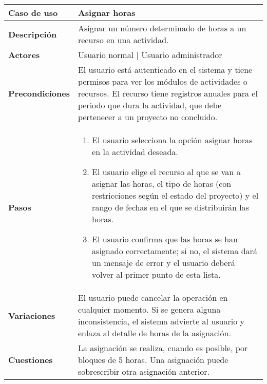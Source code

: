 \begin{tabular}{|p{1.25in}|p{3.65in}|}\hline
\textbf{Caso de uso} & \textbf{Asignar horas}\\\hline\hline
\textbf{Descripción} & Asignar un número determinado de horas a un recurso en
una actividad. \\\hline
\textbf{Actores} & Usuario normal | Usuario administrador\\\hline
\textbf{Precondiciones} & El usuario está autenticado en el sistema y
tiene permisos para ver los módulos de actividades o recursos. El
recurso tiene registros anuales para el periodo que dura la actividad,
que debe pertenecer a un proyecto no concluido.\\\hline
\textbf{Pasos} &
  \begin{enumerate}
   \item El usuario selecciona la opción asignar horas en la actividad deseada.
   \item El usuario elige el recurso al que se van a asignar las horas, el
tipo de horas (con restricciones según el estado del proyecto) y el rango de
fechas en el que se distribuirán las horas.
   \item El usuario confirma que las horas se han asignado correctamente; si
no, el sistema dará un mensaje de error y el usuario deberá volver al primer
punto de esta lista.
  \end{enumerate}
\\\hline
\textbf{Variaciones} & El usuario puede cancelar la operación en
cualquier momento. Si se genera alguna inconsistencia, el sistema advierte al
usuario y enlaza al detalle de horas de la asignación.\\\hline
\textbf{Cuestiones} & La asignación se realiza, cuando es posible, por
bloques de 5 horas. Una asignación puede sobrescribir otra asignación
anterior. \\\hline
\end{tabular}

